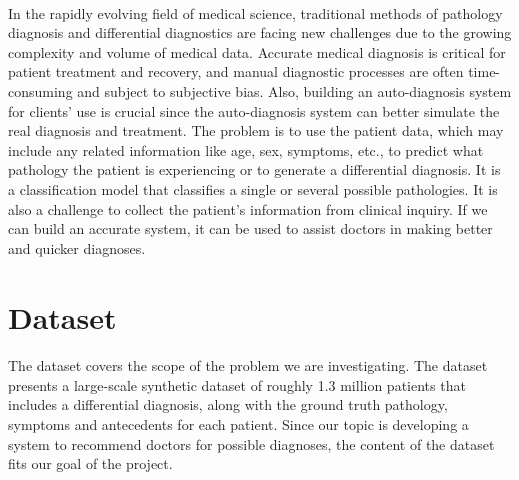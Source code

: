 \documentclass{article}
\begin{document}
\paragraph{ }
In the rapidly evolving field of medical science, traditional methods of pathology diagnosis and differential diagnostics are facing new challenges due to the growing complexity and volume of medical data. Accurate medical diagnosis is critical for patient treatment and recovery, and manual diagnostic processes are often time-consuming and subject to subjective bias. Also, building an auto-diagnosis system for clients' use is crucial since the auto-diagnosis system can better simulate the real diagnosis and treatment. The problem is to use the patient data, which may include any related information like age, sex, symptoms, etc., to predict what pathology the patient is experiencing or to generate a differential diagnosis. It is a classification model that classifies a single or several possible pathologies. It is also a challenge to collect the patient's information from clinical inquiry. If we can build an accurate system, it can be used to assist doctors in making better and quicker diagnoses.

\section{Dataset}

\paragraph{ }
The dataset covers the scope of the problem we are investigating. The dataset presents a large-scale synthetic dataset of roughly 1.3 million patients that includes a differential diagnosis, along with the ground truth pathology, symptoms and antecedents for each patient. Since our topic is developing a system to recommend doctors for possible diagnoses, the content of the dataset fits our goal of the project.
\end{document}

